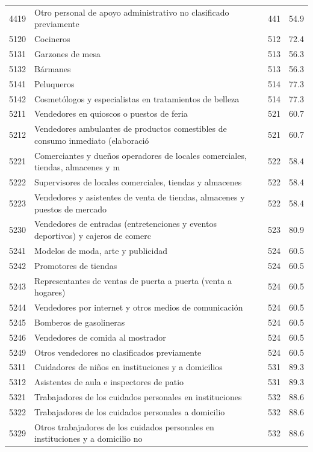 \begin{longtable}{@{}c p{} c r@{}}
4419 & Otro personal de apoyo administrativo no clasificado previamente & 441 & 54.9 \\
5120 & Cocineros & 512 & 72.4 \\
5131 & Garzones de mesa & 513 & 56.3 \\
5132 & Bármanes & 513 & 56.3 \\
5141 & Peluqueros & 514 & 77.3 \\
5142 & Cosmetólogos y especialistas en tratamientos de belleza & 514 & 77.3 \\
5211 & Vendedores en quioscos o puestos de feria & 521 & 60.7 \\
5212 & Vendedores ambulantes de productos comestibles de consumo inmediato (elaboració & 521 & 60.7 \\
5221 & Comerciantes y dueños operadores de locales comerciales, tiendas, almacenes y m & 522 & 58.4 \\
5222 & Supervisores de locales comerciales, tiendas y almacenes & 522 & 58.4 \\
5223 & Vendedores y asistentes de venta de tiendas, almacenes y puestos de mercado & 522 & 58.4 \\
5230 & Vendedores de entradas (entretenciones y eventos deportivos) y cajeros de comerc & 523 & 80.9 \\
5241 & Modelos de moda, arte y publicidad & 524 & 60.5 \\
5242 & Promotores de tiendas & 524 & 60.5 \\
5243 & Representantes de ventas de puerta a puerta (venta a hogares) & 524 & 60.5 \\
5244 & Vendedores por internet y otros medios de comunicación & 524 & 60.5 \\
5245 & Bomberos de gasolineras & 524 & 60.5 \\
5246 & Vendedores de comida al mostrador & 524 & 60.5 \\
5249 & Otros vendedores no clasificados previamente & 524 & 60.5 \\
5311 & Cuidadores de niños en instituciones y a domicilios & 531 & 89.3 \\
5312 & Asistentes de aula e inspectores de patio & 531 & 89.3 \\
5321 & Trabajadores de los cuidados personales en instituciones & 532 & 88.6 \\
5322 & Trabajadores de los cuidados personales a domicilio & 532 & 88.6 \\
5329 & Otros trabajadores de los cuidados personales en instituciones y a domicilio no & 532 & 88.6 \\

\end{longtable}
